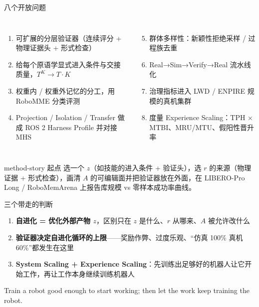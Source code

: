 \documentclass[aspectratio=169,10pt]{beamer}
\newcommand{\en}[1]{{\footnotesize\textcolor{neutral}{#1}}}
\begin{document}
\begin{frame}{八个开放问题}
\begin{columns}[T]
\begin{enumerate}
  \item 可扩展的分层验证器（连续评分 + 物理证据头 + 形式检查）
  \item 给每个原语学显式进入条件与交接质量，$T^K \to T\cdot K$
  \item 权重内 / 权重外记忆的分工，用 RoboMME 分类评测
  \item Projection / Isolation / Transfer 做成 ROS 2 Harness Profile 并对接 MHS
\end{enumerate}
\begin{enumerate}
  \setcounter{enumi}{4}
  \item 群体多样性：新颖性拒绝采样 / 过程族去重
  \item Real→Sim→Verify→Real 流水线化
  \item 治理指标进入 LWD / ENPIRE 规模的真机集群
  \item 度量 Experience Scaling：TPH × MTBI、MRU/MTU、假阳性晋升率
\end{enumerate}
\end{columns}
\begin{block}{method-story 起点}
选一个 $z$（如技能的进入条件 + 验证头），选 $r$ 的来源（物理证据 + 形式检查），画清 $A$ 的可编辑面并把验证器放在外面，在 LIBERO-Pro Long / RoboMemArena 上报告库规模 vs 零样本成功率曲线。
\end{block}
\end{frame}

\begin{frame}{三个带走的判断}
\begin{enumerate}
  \item \textbf{自进化 = 优化外部产物 $z$}，区别只在 $z$ 是什么、$r$ 从哪来、$A$ 被允许改什么
  \item \textbf{验证器决定自进化循环的上限}——奖励作弊、过度乐观、“仿真 100\% 真机 60\%”都发生在这里
  \item \textbf{System Scaling + Experience Scaling}：先训练出足够好的机器人让它开始工作，再让工作本身继续训练机器人
\end{enumerate}
\vspace{8pt}
\en{Train a robot good enough to start working; then let the work keep training the robot.}
\end{frame}
\end{document}
